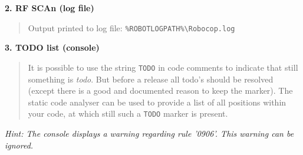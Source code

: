 \textbf{2. RF SCAn (log file)}
\begin{quote}
Output printed to log file: \texttt{\%ROBOTLOGPATH\%\textbackslash{}Robocop.log}
\end{quote}

\textbf{3. TODO list (console)}
\begin{quote}
It is possible to use the string \texttt{TODO} in code comments to indicate that still something is \emph{todo}. But before a release all todo's should be resolved
(except there is a good and documented reason to keep the marker).
The static code analyser can be used to provide a list of all positions within your code, at which still such a \texttt{TODO} marker is present.
\end{quote}

\emph{Hint: The console displays a warning regarding rule '0906'. This warning can be ignored.}



